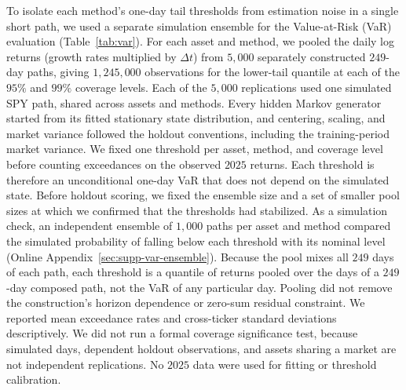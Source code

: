 To isolate each method's one-day tail thresholds from estimation
noise in a single short path, we used a separate simulation ensemble
for the Value-at-Risk (VaR) evaluation (Table~\ref{tab:var}). For each asset and method, we pooled the daily log returns (growth
rates multiplied by $\Delta t$) from $5{,}000$ separately constructed
$249$-day paths, giving $1{,}245{,}000$ observations for the lower-tail
quantile at each of the $95\%$ and $99\%$ coverage levels. Each of the $5{,}000$ replications used one simulated SPY path, shared
across assets and methods. Every hidden Markov generator started from
its fitted stationary state distribution, and centering, scaling, and market variance followed the holdout
conventions, including the training-period market variance. We fixed one threshold per asset, method, and
coverage level before counting exceedances on the observed $2025$ returns. Each threshold is therefore an
unconditional one-day VaR that does
not depend on the simulated state. Before holdout scoring, we fixed the ensemble size and a set of
smaller pool sizes at which we confirmed that the thresholds had
stabilized. As a simulation check, an independent ensemble of $1{,}000$
paths per asset and method compared the simulated probability of
falling below each threshold with its nominal level (Online
Appendix~\ref{sec:supp-var-ensemble}). Because the pool mixes all $249$ days of each path, each threshold is
a quantile of returns pooled over the days of a $249$-day composed
path, not the VaR of any particular day. Pooling did not remove the construction's horizon
dependence or zero-sum residual constraint. We reported mean
exceedance rates and cross-ticker standard deviations descriptively. We did not run a formal coverage
significance test, because
simulated days, dependent holdout observations, and assets sharing a
market are not independent replications. No $2025$ data were used for
fitting or threshold calibration.


